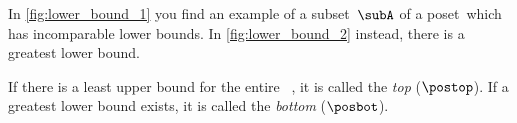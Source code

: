 \begin{solution}
    \begin{marginfigure}
        \centering
        \caption{
            Example of lower bounds of~$\subA$.
        }
        \label{fig:lower_bound_1}
    \end{marginfigure}

    \begin{marginfigure}
        \centering
        \caption{
            Example of lower bounds and greatest lower bounds of~$\subA$.
        }
        \label{fig:lower_bound_2}
    \end{marginfigure}

    In \cref{fig:lower_bound_1} you find an example of a subset~$\subA$ of a poset~\posA which has incomparable lower bounds.
    In \cref{fig:lower_bound_2} instead, there is a greatest lower bound.
\end{solution}

\begin{ctdefinition}
    \label{def:top}
    \label{def:bot}
    If there is a least upper bound for the entire ~\posA, it is called the \emph{top} ($\postop$).
    If a greatest lower bound exists, it is called the \emph{bottom} ($\posbot$).
\end{ctdefinition}


